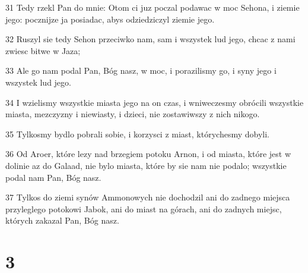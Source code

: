 \par 31 Tedy rzekl Pan do mnie: Otom ci juz poczal podawac w moc Sehona, i ziemie jego: pocznijze ja posiadac, abys odziedziczyl ziemie jego.
\par 32 Ruszyl sie tedy Sehon przeciwko nam, sam i wszystek lud jego, chcac z nami zwiesc bitwe w Jaza;
\par 33 Ale go nam podal Pan, Bóg nasz, w moc, i porazilismy go, i syny jego i wszystek lud jego.
\par 34 I wzielismy wszystkie miasta jego na on czas, i wniweczesmy obrócili wszystkie miasta, mezczyzny i niewiasty, i dzieci, nie zostawiwszy z nich nikogo.
\par 35 Tylkosmy bydlo pobrali sobie, i korzysci z miast, którychesmy dobyli.
\par 36 Od Aroer, które lezy nad brzegiem potoku Arnon, i od miasta, które jest w dolinie az do Galaad, nie bylo miasta, które by sie nam nie podalo; wszystkie podal nam Pan, Bóg nasz.
\par 37 Tylkos do ziemi synów Ammonowych nie dochodzil ani do zadnego miejsca przyleglego potokowi Jabok, ani do miast na górach, ani do zadnych miejsc, których zakazal Pan, Bóg nasz.

\chapter{3}


